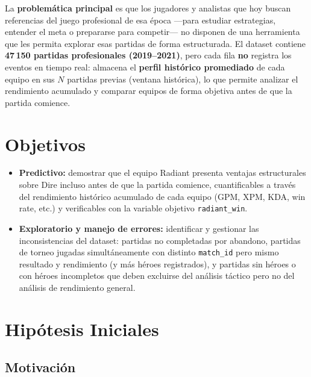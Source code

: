 \documentclass[12pt,a4paper]{article}
\begin{document}
La \textbf{problem\'atica principal} es que los jugadores y analistas que hoy
buscan referencias del juego profesional de esa \'epoca ---para estudiar estrategias,
entender el meta o prepararse para competir--- no disponen de una herramienta
que les permita explorar esas partidas de forma estructurada. El dataset contiene
\textbf{47\,150 partidas profesionales (2019--2021)}, pero cada fila \textbf{no}
registra los eventos en tiempo real: almacena el \textbf{perfil hist\'orico
promediado} de cada equipo en sus $N$ partidas previas (ventana hist\'orica),
lo que permite analizar el rendimiento acumulado y comparar equipos de forma
objetiva antes de que la partida comience.

\section{Objetivos}

\begin{itemize}
  \item \textbf{Predictivo:} demostrar que el equipo Radiant presenta ventajas
        estructurales sobre Dire incluso antes de que la partida comience,
        cuantificables a trav\'es del rendimiento hist\'orico acumulado de cada
        equipo (GPM, XPM, KDA, win rate, etc.) y verificables con la variable
        objetivo \texttt{radiant\_win}.
  \item \textbf{Exploratorio y manejo de errores:} identificar y gestionar
        las inconsistencias del dataset: partidas no completadas por abandono,
        partidas de torneo jugadas simult\'aneamente con distinto \texttt{match\_id}
        pero mismo resultado y rendimiento (y m\'as h\'eroes registrados), y
        partidas sin h\'eroes o con h\'eroes incompletos que deben excluirse del
        an\'alisis t\'actico pero no del an\'alisis de rendimiento general.
\end{itemize}

\section{Hip\'otesis Iniciales}

\subsection{Motivaci\'on}
\end{document}
